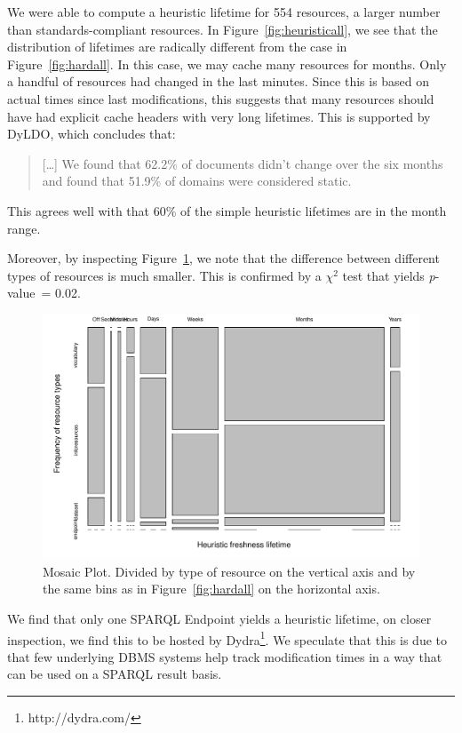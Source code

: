\documentclass{llncs}
\newcommand{\pvalue}{\textit{p}-value\ }
\begin{document}
We were able to compute a heuristic lifetime for 554 resources, a
larger number than standards-compliant resources. In
Figure~\ref{fig:heuristicall}, we see that the distribution of
lifetimes are radically different from the case in
Figure~\ref{fig:hardall}. In this case, we may cache many resources
for months. Only a handful of resources had changed in the last
minutes. Since this is based on actual times since last modifications,
this suggests that many resources should have had explicit cache
headers with very long lifetimes. This is supported by
DyLDO\cite{dyldo2}, which concludes that:
\begin{quote}
[\ldots] We found that 62.2\% of documents didn’t change over the six
months and found that 51.9\% of domains were considered static.
\end{quote}
This agrees well with that 60\% of the simple heuristic lifetimes are
in the month range. 

Moreover, by inspecting Figure~\ref{fig:heuristictable}, we
note that the difference between different types of resources is much
smaller. This is confirmed by a $\chi^2$ test that yields \pvalue =
0.02.

\begin{figure}[hb!]
  \centerline{%
    \includegraphics[width=.9\textwidth]{heuristictable.pdf}}
  \caption{Mosaic Plot. Divided by type of resource on the vertical
    axis and by the same bins as in Figure~\ref{fig:hardall} on the
    horizontal axis. }
  \label{fig:heuristictable}
\end{figure}


We find that only one SPARQL Endpoint yields a heuristic lifetime, on
closer inspection, we find this to be hosted by
Dydra\footnote{http://dydra.com/}. We speculate that this is due to
that few underlying DBMS systems help track modification times in a
way that can be used on a SPARQL result basis.
\end{document}
